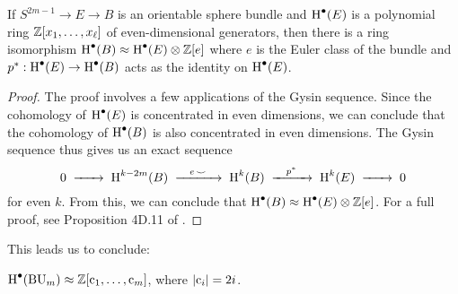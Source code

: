 \begin{lemma}
	If $S^{2m-1} \to E \to B$ is an orientable sphere bundle and $\operatorname{H}^\bullet(E)$ is a polynomial ring $\mathbb{Z}[x_1,\ldots,x_\ell]$ of even-dimensional generators, then there is a ring isomorphism $\operatorname{H}^\bullet(B)\approx \operatorname{H}^\bullet(E)\otimes \mathbb{Z}[e]$ where $e$ is the Euler class of the bundle and $p^* : \operatorname{H}^\bullet(E) \to \operatorname{H}^\bullet(B)$ acts as the identity on $\operatorname{H}^\bullet(E)$.
\end{lemma}
\begin{proof}
	The proof involves a few applications of the Gysin sequence. Since the cohomology of $\operatorname{H}^\bullet(E)$ is concentrated in even dimensions, we can conclude that the cohomology of $\operatorname{H}^\bullet(B)$ is also concentrated in even dimensions. The Gysin sequence thus gives us an exact sequence
\[
	0 \lkxto \H^{k-2m}(B) \lkxto[e\,\smile]\H^k(B) \lkxto[p^*] \H^k(E) \lkxto 0
\]
for even $k$. From this, we can conclude that $\operatorname{H}^\bullet(B)\approx \operatorname{H}^\bullet(E)\otimes \mathbb{Z}[e]$.
For a full proof, see Proposition 4D.11 of \cite{hatcher2002topology}.
\end{proof}

This leads us to conclude:
\begin{proposition}
	$\operatorname{H}^\bullet(\mathrm{BU}_m)\approx \mathbb{Z}[\mathrm{c}_1,\ldots, \mathrm{c}_m]$, where $|\mathrm{c}_i|=2i$.
\end{proposition}

